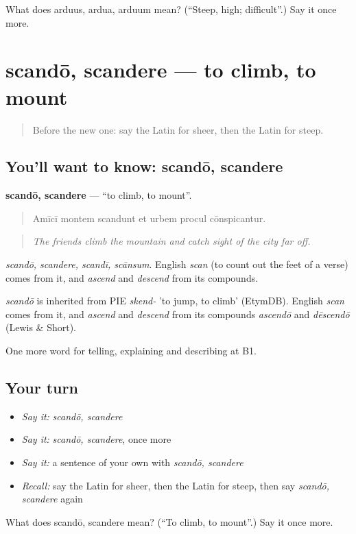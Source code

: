 \begin{tcolorbox}[breakable,colback=teal!4,colframe=teal!35!black,title={Before you move on}]
What does arduus, ardua, arduum mean? (\textquotedblleft{}Steep, high; difficult\textquotedblright{}.) Say it once more.
\end{tcolorbox}
\section[scandō, scandere]{scandō, scandere — to climb, to mount}

\label{lesson:LA-C480-scando}



\begin{quote}
Before the new one: say the Latin for sheer, then the Latin for steep.
\end{quote}

\subsection*{You'll want to know: scandō, scandere}
\textbf{scandō, scandere} — \textquotedblleft{}to climb, to mount\textquotedblright{}.

\begin{quote}
Amīcī montem scandunt et urbem procul cōnspicantur.
\end{quote}

\begin{quote}
\emph{The friends climb the mountain and catch sight of the city far off.}
\end{quote}

\emph{scandō, scandere, scandī, scānsum}. English \emph{scan} (to count out the feet of a verse) comes from it, and \emph{ascend} and \emph{descend} from its compounds.

\begin{cousinweb}
\emph{scandō} is inherited from PIE \emph{skend-} 'to jump, to climb' (EtymDB). English \emph{scan} comes from it, and \emph{ascend} and \emph{descend} from its compounds \emph{ascendō} and \emph{dēscendō} (Lewis \& Short).
\end{cousinweb}

\begin{grammarlens}[title={What you've built}]
One more word for telling, explaining and describing at B1.
\end{grammarlens}

\subsection*{Your turn}
\begin{itemize}
\raggedright
  \item \emph{Say it:} \emph{scandō, scandere}
  \item \emph{Say it:} \emph{scandō, scandere}, once more
  \item \emph{Say it:} a sentence of your own with \emph{scandō, scandere}
  \item \emph{Recall:} say the Latin for sheer, then the Latin for steep, then say \emph{scandō, scandere} again
\end{itemize}

\begin{tcolorbox}[breakable,colback=teal!4,colframe=teal!35!black,title={Before you move on}]
What does scandō, scandere mean? (\textquotedblleft{}To climb, to mount\textquotedblright{}.) Say it once more.
\end{tcolorbox}
